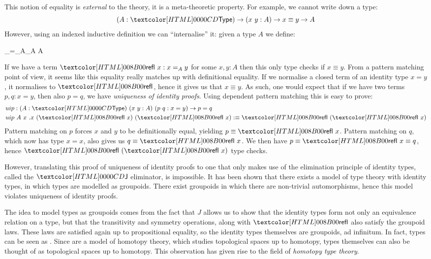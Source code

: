 This notion of equality is \emph{external} to the theory, it is a
meta-theoretic property. For example, we cannot write down a type:
$$
(A : \Type) \to (x\ y : A) \to x \equiv y \to A
$$
However, using an indexed inductive definition we can ``internalise''
it: given a type $A$ we define:
%
\begin{datatype}{\_=_A\_}{A \to A \to \Type}
\end{datatype}
%
If we have a term $\refl\ x : x =_A y$ for some $x, y : A$ then this
only type checks if $x \equiv y$. From a pattern matching point of
view, it seems like this equality really matches up with definitional
equality. If we normalise a closed term of an identity type $x = y$,
it normalises to $\refl$, hence it gives us that $x \equiv y$. As
such, one would expect that if we have two terms $p, q : x = y$, then
also $p = q$, \ie we have \emph{uniqueness of identity proofs}. Using
dependent pattern matching this is easy to prove:
\begin{align*}
  &uip : (A : \Type)\ (x\ y : A)\ (p\ q : x = y) \to p = q \\
  &uip\ A\ x\ .x\ (\refl\ x)\ (\refl\ x) \ddefeq \refl\ (\refl\ x)
\end{align*}
Pattern matching on $p$ forces $x$ and $y$ to be definitionally equal,
yielding $p \equiv \refl\ x$. Pattern matching on $q$, which now has
type $x = x$, also gives us $q \equiv \refl\ x$. We then have
$p \equiv \refl\ x \equiv q$, hence $\refl\ (\refl\ x)$ type checks.

However, translating this proof of uniqueness of identity proofs to
one that only makes use of the elimination principle of identity
types, called the $\J$ eliminator, is impossible. It has been shown
that there exists a model of type theory with identity types, in which
types are modelled as groupoids. There exist groupoids in which there
are non-trivial automorphisms, hence this model violates uniqueness of
identity proofs.

The idea to model types as groupoids comes from the fact that $J$
allows us to show that the identity types form not only an equivalence
relation on a type, but that the transitivity and symmetry operations,
along with $\refl$ also satisfy the groupoid laws. These laws are
satisfied again up to propositional equality, so the identity types
themselves are groupoids, ad infinitum. In fact, types can be seen as
\inftygrpds. Since \inftygrpds are a model of homotopy theory, which
studies topological spaces up to homotopy, types themselves can also
be thought of as topological spaces up to homotopy. This observation
has given rise to the field of \emph{homotopy type theory}.

